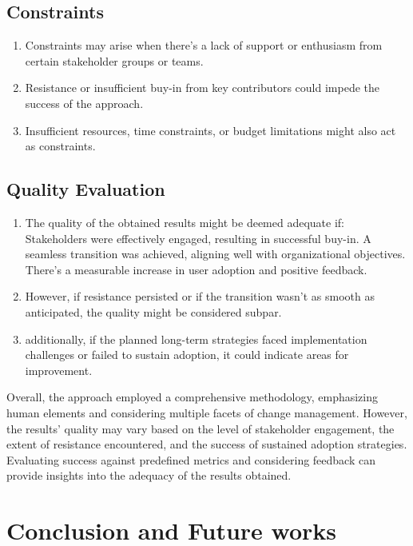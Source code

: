 \documentclass[11pt,letterpaper]{report}
\begin{document}
\section{Constraints}
\begin{enumerate}
    \item Constraints may arise when there's a lack of support or enthusiasm from certain stakeholder groups or teams.
    \item Resistance or insufficient buy-in from key contributors could impede the success of the approach.
    \item Insufficient resources, time constraints, or budget limitations might also act as constraints.
\end{enumerate}

\section{Quality Evaluation}
\begin{enumerate}
    \item The quality of the obtained results might be deemed adequate if:
    Stakeholders were effectively engaged, resulting in successful buy-in.
    A seamless transition was achieved, aligning well with organizational objectives.
There's a measurable increase in user adoption and positive feedback.
    \item However, if resistance persisted or if the transition wasn't as smooth as anticipated, the quality might be considered subpar.
    \item additionally, if the planned long-term strategies faced implementation challenges or failed to sustain adoption, it could indicate areas for improvement.
\end{enumerate}
Overall, the approach employed a comprehensive methodology, emphasizing human elements and considering multiple facets of change management. However, the results' quality may vary based on the level of stakeholder engagement, the extent of resistance encountered, and the success of sustained adoption strategies. Evaluating success against predefined metrics and considering feedback can provide insights into the adequacy of the results obtained.

\chapter{Conclusion and Future works}
\end{document}
